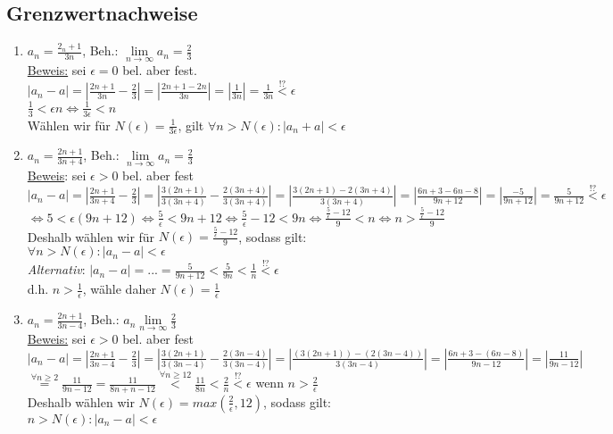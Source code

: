 \documentclass[a4paper,11pt]{article}
\begin{document}
\subsection{Grenzwertnachweise}
\begin{enumerate}[label={\alph*)}]
	\item $a_n=\frac{2_n+1}{3n}$, Beh.: $\underset{n\to\infty}{\lim}a_n=\frac{2}{3}$\\
		\underline{Beweis:} sei $\epsilon=0$ bel. aber fest.\\
		$|a_n-a|=|\frac{2n+1}{3n}-\frac{2}{3}|=|\frac{2n+1-2n}{3n}|=|\frac{1}{3n}|=\frac{1}{3n}\stackrel{!?}{<}\epsilon$\\
		$\frac{1}{3}<\epsilon n\Leftrightarrow \frac{1}{3\epsilon}<n$\\
		Wählen wir für $N(\epsilon)=\frac{1}{3\epsilon}$, gilt $\forall n>N(\epsilon):|a_n+a|<\epsilon$
	\item $a_n=\frac{2n+1}{3n+4}$, Beh.: $\underset{n\to\infty}{\lim}a_n=\frac{2}{3}$\\
		\underline{Beweis}: sei $\epsilon>0$ bel. aber fest\\
		$|a_n-a|=|\frac{2n+1}{3n+4}-\frac{2}{3}|=|\frac{3(2n+1)}{3(3n+4)}-\frac{2(3n+4)}{3(3n+4)}|=|\frac{3(2n+1)-2(3n+4)}{3(3n+4)}|=|\frac{6n+3-6n-8}{9n+12}|=|\frac{-5}{9n+12}|=\frac{5}{9n+12}\overset{!?}{<}\epsilon$\\
		$\Leftrightarrow 5<\epsilon(9n+12) \Leftrightarrow\frac{5}{\epsilon}<9n+12\Leftrightarrow\frac{5}{\epsilon}-12<9n\Leftrightarrow\frac{\frac{5}{\epsilon}-12}{9}<n\Leftrightarrow n>\frac{\frac{5}{\epsilon}-12}{9}$\\
		Deshalb wählen wir für $N(\epsilon)=\frac{\frac{5}{\epsilon}-12}{9}$, sodass gilt:\\
		$\forall n>N(\epsilon):|a_n-a|<\epsilon$\\
		\emph{Alternativ}: $|a_n-a|=...=\frac{5}{9n+12}<\frac{5}{9n}<\frac{1}{n}\overset{!?}{<}\epsilon$\\
		d.h. $n>\frac{1}{\epsilon}$, wähle daher $N(\epsilon)=\frac{1}{\epsilon}$
	\item $a_n=\frac{2n+1}{3n-4}$, Beh.: $a_n\underset{n\to\infty}{\lim}\frac{2}{3}$\\
		\underline{Beweis:} sei $\epsilon>0$ bel. aber fest\\
		$|a_n-a|=|\frac{2n+1}{3n-4}-\frac{2}{3}|=|\frac{3(2n+1)}{3(3n-4)}-\frac{2(3n-4)}{3(3n-4)}|=|\frac{(3(2n+1))-(2(3n-4))}{3(3n-4)}|=|\frac{6n+3-(6n-8)}{9n-12}|=|\frac{11}{9n-12}|$\\
		$\overset{\forall n\geq2}{=}\frac{11}{9n-12}=\frac{11}{8n+n-12}\overset{\forall n\geq12}{<}\frac{11}{8n}<\frac{2}{n}\overset{!?}{<}\epsilon$ wenn $n>\frac{2}{\epsilon}$\\
		Deshalb wählen wir $N(\epsilon)=max(\frac{2}{\epsilon},12)$, sodass gilt:\\
		$n>N(\epsilon):|a_n-a|<\epsilon$
	\end{enumerate}
\end{document}

